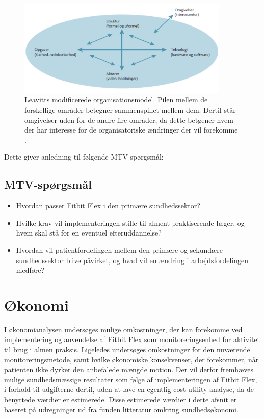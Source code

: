 \begin{figure}[H]
\centering
\includegraphics[width=0.9\textwidth]{figures/leavitt}
\caption{Leavitts modificerede organisationsmodel. Pilen mellem de forskellige områder betegner sammenspillet mellem dem. Dertil står omgivelser uden for de andre fire områder, da dette betgener hvem der har interesse for de organisatoriske ændringer der vil forekomme \citep{mtvhaandbog}.}
\label{fig:leavittmodel}
\end{figure}
\noindent
Dette giver anledning til følgende MTV-spørgsmål:

\subsection{MTV-spørgsmål}
\begin{itemize}
\item Hvordan passer Fitbit Flex i den primære sundhedssektor? 
\item Hvilke krav vil implementeringen stille til alment praktiserende læger, og hvem skal stå for en eventuel efteruddannelse? 
\item  Hvordan vil patientfordelingen mellem den primære og sekundære sundhedssektor blive påvirket, og hvad vil en ændring i arbejdsfordelingen medføre?
\end{itemize}

\section{Økonomi}\label{sec:metode_oeko}
I økonomianalysen undersøges mulige omkostninger, der kan forekomme ved implementering og anvendelse af Fitbit Flex som monitoreringsenhed for aktivitet til brug i almen praksis.
Ligeledes undersøges omkostninger for den nuværende monitoreringsmetode, samt hvilke økonomiske konsekvenser, der forekommer, når patienten ikke dyrker den anbefalede mængde motion.
Der vil derfor fremhæves mulige sundhedsmæssige resultater som følge af implementeringen af Fitbit Flex, i forhold til udgifterne dertil, uden at lave en egentlig cost-utility analyse, da de benyttede værdier er estimerede. 
Disse estimerede værdier i dette afsnit er baseret på udregninger ud fra funden litteratur omkring sundhedsøkonomi.

